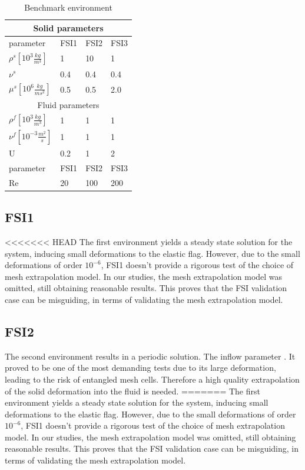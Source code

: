 \begin{table}[h]
\centering
\caption{Benchmark environment}
\label{my-label}
\begin{tabular}{ |p{3cm}||p{2cm}|p{2cm}|p{2cm}|  }
 \hline
 \multicolumn{4}{|c|}{Solid parameters} \\
 \hline
 parameter              & FSI1 & FSI2 & FSI3 \\
 \hline
 $\rho^s [10^{3} \frac{kg}{m^3}]$ & 1    & 10   & 1    \\
$\nu^s$ & 0.4  & 0.4  & 0.4  \\
$\mu^s  [10^{6}\frac{kg}{ms^2}]$  & 0.5  & 0.5  & 2.0  \\
 \hline
 \multicolumn{4}{|c|}{Fluid parameters} \\
 \hline
$\rho^f [10^{3}\frac{kg}{m^3}]$ & 1    & 1    & 1    \\
$\nu^f  [10^{-3}\frac{m^2}{s}]$  & 1    & 1    & 1    \\
U                      & 0.2  & 1    & 2    \\
parameter              & FSI1 & FSI2 & FSI3 \\
Re                     & 20   & 100  & 200 \\
\hline
\end{tabular}
\end{table}


\subsection{FSI1}
<<<<<<< HEAD
The first environment yields a steady state solution for the system, inducing small deformations to the elastic flag. However, due to the small deformations of order $10^{-6}$, FSI1 doesn't provide a rigorous test of the choice of mesh extrapolation model. In our studies, the mesh extrapolation model was omitted, still obtaining reasonable results. This proves that the FSI validation case can be misguiding, in terms of validating the mesh extrapolation model.


\subsection{FSI2}
The second environment results in a periodic solution. The inflow parameter .
It proved to be one of the most demanding tests due to its large deformation, leading to the risk of entangled mesh cells. Therefore a high quality extrapolation of the solid deformation into the fluid is needed.
=======
The first environment yields a steady state solution for the system, inducing small deformations to the elastic flag. However, due to the small deformations of order $10^{-6}$, FSI1 doesn't provide a rigorous test of the choice of mesh extrapolation model. In our studies, the mesh extrapolation model was omitted, still obtaining reasonable results. This proves that the FSI validation case can be misguiding, in terms of validating the mesh extrapolation model. 
 

